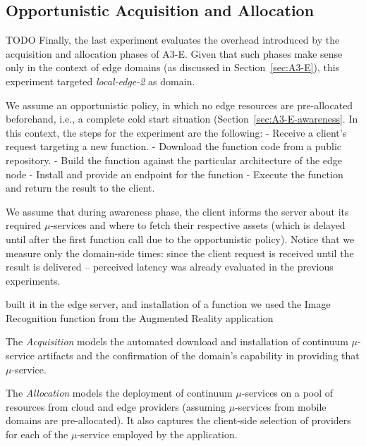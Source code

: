 


\subsection{Opportunistic Acquisition and Allocation}
TODO
Finally, the last experiment evaluates the overhead introduced by the acquisition and allocation phases of A3-E. Given that such phases make sense only in the context of edge domains (as discussed in Section~\ref{sec:A3-E}), this experiment targeted \textit{local-edge-2} as domain. 

We assume an opportunistic policy, in which no edge resources are pre-allocated beforehand, i.e., a complete  cold start situation (Section~\ref{sec:A3-E-awareness}. In this context, the steps for the experiment are the following:
- Receive a client's request targeting a new function.
- Download the function code from a public repository.
- Build the function against the particular architecture of the edge node
- Install and provide an endpoint for the function 
- Execute the function and return the result to the client.

 We assume that during awareness phase, the client informs the server about its required $\mu$-services and where to fetch their respective assets (which is delayed until after the first function call due to the opportunistic policy). Notice that we measure only the domain-side times: since the client request is received until the result is delivered -- perceived latency was already evaluated in the previous experiments.




built it in the edge server, and installation of a function
we used the Image Recognition function from the Augmented Reality application 


The \textit{Acquisition} models the automated download and installation of continuum $\mu$-service artifacts and the confirmation of the domain's capability in providing that $\mu$-service.

The \textit{Allocation} models the deployment of continuum $\mu$-services on a pool of resources from cloud and edge providers (assuming $\mu$-services from mobile domains are pre-allocated). It also captures the client-side selection of providers for each of the $\mu$-service employed by the application.




